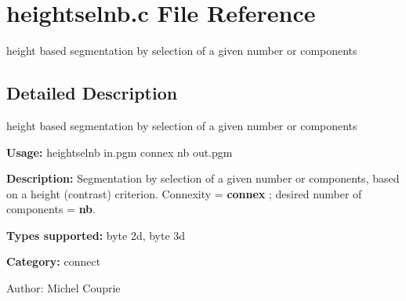 \section{heightselnb.c File Reference}
\label{heightselnb_8c}
height based segmentation by selection of a given number or components 



\subsection{Detailed Description}
height based segmentation by selection of a given number or components 

{\bf Usage:} heightselnb in.pgm connex nb out.pgm

{\bf Description:} Segmentation by selection of a given number or components, based on a height (contrast) criterion. Connexity = {\bf connex} ; desired number of components = {\bf nb}.

{\bf Types supported:} byte 2d, byte 3d

{\bf Category:} connect

\begin{Desc}
\item[Author:]Michel Couprie \end{Desc}
